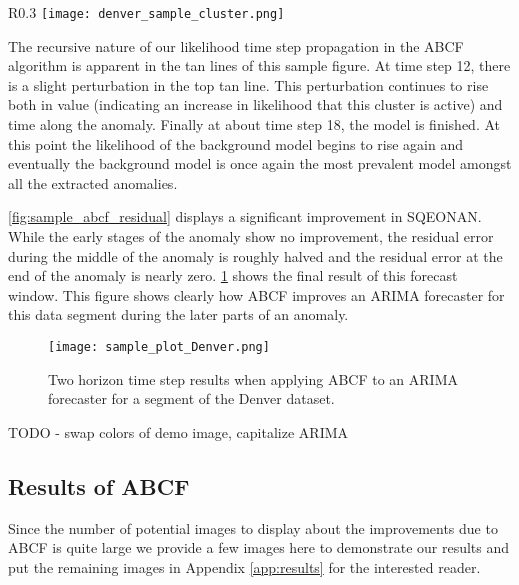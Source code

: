 \begin{wrapfigure}{R}{0.3\textwidth}
\centering
\texttt{[image: denver\_sample\_cluster.png]}
\caption{Extracted sample clustered anomaly.}
\label{fig:sample_cluster}
\end{wrapfigure}

The recursive nature of our likelihood time step propagation in the ABCF algorithm is apparent in the tan lines of this sample figure.  At time step 12, there is a slight perturbation in the top tan line.  This perturbation continues to rise both in value (indicating an increase in likelihood that this cluster is active) and time along the anomaly.  Finally at about time step 18, the model is finished.  At this point the likelihood of the background model begins to rise again and eventually the background model is once again the most prevalent model amongst all the extracted anomalies.

\ref{fig:sample_abcf_residual} displays a significant improvement in SQEONAN.  While the early stages of the anomaly show no improvement, the residual error during the middle of the anomaly is roughly halved and the residual error at the end of the anomaly is nearly zero.  \ref{fig:sample_abcf_denver} shows the final result of this forecast window.  This figure shows clearly how ABCF improves an ARIMA forecaster for this data segment during the later parts of an anomaly.

\begin{figure}[!h]
	\begin{center}
		\texttt{[image: sample\_plot\_Denver.png]}
	\end{center}
	\caption{Two horizon time step results when applying ABCF to an ARIMA forecaster for a segment of the Denver dataset.}
	\label{fig:sample_abcf_denver}
\end{figure}

TODO - swap colors of demo image, capitalize ARIMA

\subsection{Results of ABCF}
Since the number of potential images to display about the improvements due to ABCF is quite large  we provide a few images here to demonstrate our results and put the remaining images in Appendix \ref{app:results} for the interested reader.

